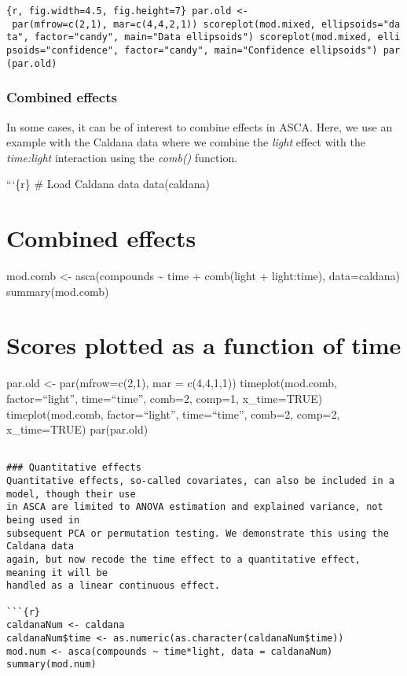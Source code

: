 \texttt{\{r,\ fig.width=4.5,\ fig.height=7\}\ par.old\ \textless{}-\ par(mfrow=c(2,1),\ mar=c(4,4,2,1))\ scoreplot(mod.mixed,\ ellipsoids="data",\ factor="candy",\ main="Data\ ellipsoids")\ scoreplot(mod.mixed,\ ellipsoids="confidence",\ factor="candy",\ main="Confidence\ ellipsoids")\ par(par.old)}

\subsubsection{Combined effects}\label{combined-effects}

In some cases, it can be of interest to combine effects in ASCA. Here,
we use an example with the Caldana data where we combine the
\emph{light} effect with the \emph{time:light} interaction using the
\emph{comb()} function.

```\{r\} \# Load Caldana data data(caldana)

\section{Combined effects}\label{combined-effects-1}

mod.comb \textless- asca(compounds \textasciitilde{} time + comb(light +
light:time), data=caldana) summary(mod.comb)

\section{Scores plotted as a function of
time}\label{scores-plotted-as-a-function-of-time}

par.old \textless- par(mfrow=c(2,1), mar = c(4,4,1,1))
timeplot(mod.comb, factor=``light'', time=``time'', comb=2, comp=1,
x\_time=TRUE) timeplot(mod.comb, factor=``light'', time=``time'',
comb=2, comp=2, x\_time=TRUE) par(par.old)

\begin{verbatim}

### Quantitative effects
Quantitative effects, so-called covariates, can also be included in a model, though their use
in ASCA are limited to ANOVA estimation and explained variance, not being used in
subsequent PCA or permutation testing. We demonstrate this using the Caldana data
again, but now recode the time effect to a quantitative effect, meaning it will be
handled as a linear continuous effect.

```{r}
caldanaNum <- caldana
caldanaNum$time <- as.numeric(as.character(caldanaNum$time))
mod.num <- asca(compounds ~ time*light, data = caldanaNum)
summary(mod.num)
\end{verbatim}

